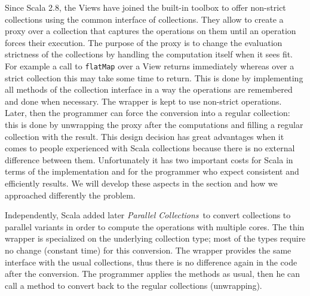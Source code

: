 \documentclass[a4paper,12pt,twocolumn]{article}
\begin{document}
Since Scala 2.8, the Views have joined the built-in toolbox to offer non-strict collections using the common interface of collections.
They allow to create a proxy over a collection that captures the operations on them until an operation forces their execution.
The purpose of the proxy is to change the evaluation strictness of the collections by handling the computation itself when it sees fit.
For example a call to \verb|flatMap| over a View returns immediately whereas over a strict collection this may take some time to return.
This is done by implementing all methods of the collection interface in a way the operations are remembered and done when necessary.
The wrapper is kept to use non-strict operations. Later, then the programmer can force the conversion into a regular collection: this is done by unwrapping the proxy after the computations and filling a regular collection with the result.
This design decision has great advantages when it comes to people experienced with Scala collections because there is no external difference between them.
Unfortunately it has two important costs for Scala in terms of the implementation and for the programmer who expect consistent and efficiently results.
We will develop these aspects in the section and how we approached differently the problem.

Independently, Scala added later {\it Parallel Collections}\ to convert collections to parallel variants in order to compute the operations with multiple cores.
The thin wrapper is specialized on the underlying collection type; most of the types require no change (constant time) for this conversion.
The wrapper provides the same interface with the usual collections, thus there is no difference again in the code after the conversion.
The programmer applies the methods as usual, then he can call a method to convert back to the regular collections (unwrapping).
\end{document}

